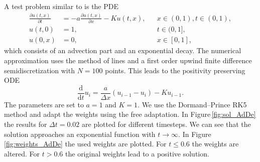 \documentclass[a4paper]{article}
\numberwithin{equation}{section}
\theoremstyle{plain}
\theoremstyle{definition}
\numberwithin{theorem}{section}
\newcommand{\1}{\mathbbm{1}}
\begin{document}
A test problem similar to \cite{shampine_non-negative_2005} is the PDE
\begin{equation}
\begin{aligned}
  \frac{\partial u(t,x)}{\partial t}
  &=
  -a \frac{\partial u(t,x)}{\partial x} - K u(t,x),
  && x \in (0, 1), t \in (0,1),
  \\
  u(t,0) &= 1,
  && t \in (0,1],
  \\
  u(0,x) &= 0,
  && x \in [0,1],
\end{aligned}
\end{equation}
which consists of an advection part and an exponential decay.
The numerical approximation uses the method of lines and a first order
upwind finite difference semidiscretization with $N = 100$ points.
This leads to the positivity preserving ODE
\begin{equation}
\frac{\mathrm d}{\mathrm d t} u_i = \frac{a}{\Delta x} \left( u_{i-1} - u_i \right) - K u_{i-1}.
\end{equation}
The parameters are set to $a=1$ and $K=1$.
We use the Dormand--Prince RK5 method and adapt the weights using the free adaptation.
In Figure\,\ref{fig:sol_AdDe} the results for $\Delta t = 0.02$ are plotted for different timesteps. We can see that the solution approaches an exponential function with $t \rightarrow \infty$.
In Figure\,\ref{fig:weights_AdDe} the used weights are plotted. For $t\leq 0.6$ the weights are altered. For $t > 0.6$ the original weights lead to a positive solution.
\end{document}
